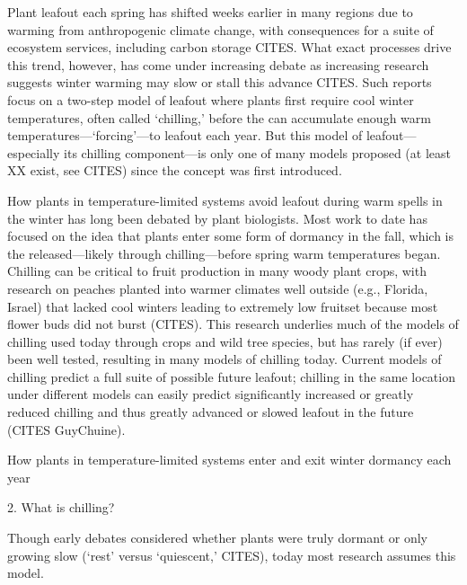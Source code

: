 \documentclass[11pt]{article}
\begin{document}

\renewcommand{\refname}{\CHead{}}

Plant leafout each spring has shifted weeks earlier in many regions due to warming from anthropogenic climate change, with consequences for a suite of ecosystem services, including carbon storage CITES.  What exact processes drive this trend, however, has come under increasing debate as increasing research suggests winter warming may slow or stall this advance CITES. Such reports focus on a two-step model of leafout where plants first require cool winter temperatures, often called `chilling,' before the can accumulate enough warm temperatures---`forcing'---to leafout each year. But this model of leafout---especially its chilling component---is only one of many models proposed (at least XX exist, see CITES) since the concept was first introduced. 

How plants in temperature-limited systems avoid leafout during warm spells in the winter has long been debated by plant biologists. Most work to date has focused on the idea that plants enter some form of dormancy in the fall, which is the released---likely through chilling---before spring warm temperatures began. Chilling can be critical to fruit production in many woody plant crops, with research on peaches planted into warmer climates well outside (e.g., Florida, Israel) that lacked cool winters leading to extremely low fruitset because most flower buds did not burst (CITES). This research underlies much of the models of chilling used today through crops and wild tree species, but has rarely (if ever) been well tested, resulting in many models of chilling today. Current models of chilling predict a full suite of possible future leafout; chilling in the same location under different models can easily predict significantly increased or greatly reduced chilling and thus greatly advanced or slowed leafout in the future (CITES GuyChuine). 



How plants in temperature-limited systems enter and exit winter dormancy each year 


2. What is chilling? 

Though early debates considered whether plants were truly dormant or only growing slow (`rest' versus `quiescent,' CITES), today most research assumes this model.
\end{document}
